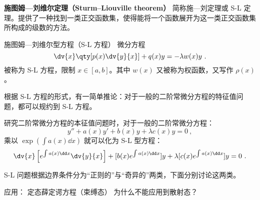 
\begin{issues}
\issueDraft
{}
\end{issues}





\textbf{施图姆—刘维尔定理（Sturm–Liouville theorem）} 简称施—刘定理或 S-L 定理。提供了一种找到一类正交函数集，使得能将一个函数展开为这一类正交函数集所构成的级数的方法。

\begin{definition}{施图姆—刘维尔型方程（S-L 方程）}
微分方程
\begin{equation}
\dv{x}\qty[p(x)\dv{y}{x}] + q(x) y = -\lambda w(x) y~.
\end{equation}
被称为 S-L 方程，限制 $x \in [a, b]$。其中 $w(x)$ 又被称为权函数，又写作 $\rho(x)$。
\end{definition}

根据 S-L 方程的形式，有一简单推论：对于一般的二阶常微分方程的特征值问题，都可以规约到 S-L 方程。
\begin{corollary}{}
研究二阶常微分方程的本征值问题时，对于一般的二阶常微分方程：
$$y'' + a(x) y' +b(x) y + \lambda c(x) y = 0 ~,$$
乘以 $\exp(\int a(x) \dd x)$ 就可以化为 S-L 型方程：
$$\dv{x} \left[e^{\int a(x) \dd x} \dv{y}{x}\right]  + [b(x) e^{\int a(x) \dd x}]y +\lambda[c(x) e^{\int a(x) \dd x}] y = 0~.$$
\end{corollary}

S-L 问题根据边界条件分为“正则的”与“奇异的”两类，下面分别讨论这两类。


 
应用： 定态薛定谔方程（束缚态） 为什么不能应用到散射态？
